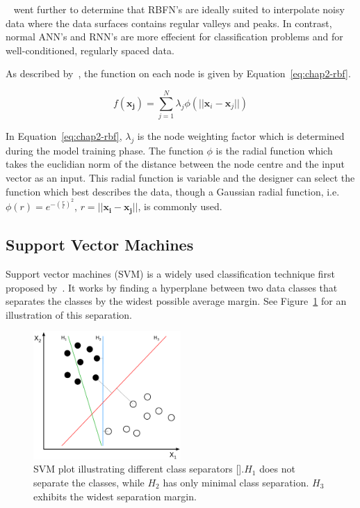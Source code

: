 ~\citeauthor{xie2011comparison} went further to determine that RBFN's are ideally suited to interpolate noisy data where the data surfaces contains regular valleys and peaks. In contrast, normal ANN's and RNN's are more effecient for classification problems and for well-conditioned, regularly spaced data. 

As described by~\cite{skala2012radial}, the function on each node is given by Equation~\ref{eq:chap2-rbf}.

\begin{equation}
  \label{eq:chap2-rbf}
  f(\bm{x_j}) = \sum\limits_{j = 1}^{N}\lambda_j \phi(|| \bm{x}_i - \bm{x}_j ||)
\end{equation}

In Equation~\ref{eq:chap2-rbf}, $\lambda_j$ is the node weighting factor which is determined during the model training phase. The function $\phi$ is the radial function which takes the euclidian norm of the distance between the node centre and the input vector as an input. This radial function is variable and the designer can select the function which best describes the data, though a Gaussian radial function, i.e.\ $\phi(r) = e^{-(\frac{r}{\epsilon})^2}$, $r = || \bm{x_i} - \bm{x_j} ||$, is commonly used.  

\subsection{Support Vector Machines}

Support vector machines (SVM) is a widely used classification technique first proposed by~\cite{vapnik1995support}. It works by finding a hyperplane between two data classes that separates the classes by the widest possible average margin. See Figure~\ref{fig:chap2-svm-linear} for an illustration of this separation.

\begin{figure}
  \centering
  \includegraphics[width=0.5\textwidth]{figures/chapter2/svm_linear}
  \caption[SVM with linear hyperplane.]{SVM plot illustrating different class separators [\cite{svm-wiki-pic}].\@$H_1$ does not separate the classes, while $H_2$ has only minimal class separation. $H_3$ exhibits the widest separation margin.}
\label{fig:chap2-svm-linear}
\end{figure}

